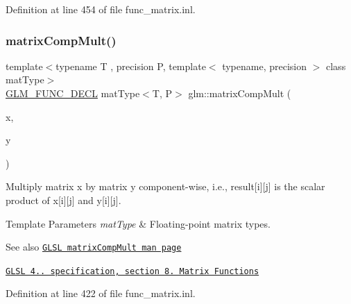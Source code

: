 Definition at line 454 of file func\+\_\+matrix.\+inl.

\mbox{\label{group__core__func__matrix_ga4a54992e4741188ee624b21e3ba91814}} 
\subsubsection{\texorpdfstring{matrix\+Comp\+Mult()}{matrixCompMult()}}
{\footnotesize\ttfamily template$<$typename T , precision P, template$<$ typename, precision $>$ class mat\+Type$>$ \\
\hyperlink{setup_8hpp_ab2d052de21a70539923e9bcbf6e83a51}{G\+L\+M\+\_\+\+F\+U\+N\+C\+\_\+\+D\+E\+CL} mat\+Type$<$T, P$>$ glm\+::matrix\+Comp\+Mult (\begin{DoxyParamCaption}\item[{mat\+Type$<$ T, P $>$ const \&}]{x,  }\item[{mat\+Type$<$ T, P $>$ const \&}]{y }\end{DoxyParamCaption})}

Multiply matrix x by matrix y component-\/wise, i.\+e., result\mbox{[}i\mbox{]}\mbox{[}j\mbox{]} is the scalar product of x\mbox{[}i\mbox{]}\mbox{[}j\mbox{]} and y\mbox{[}i\mbox{]}\mbox{[}j\mbox{]}.


\begin{DoxyTemplParams}{Template Parameters}
{\em mat\+Type} & Floating-\/point matrix types.\\
\hline
\end{DoxyTemplParams}
\begin{DoxySeeAlso}{See also}
\href{http://www.opengl.org/sdk/docs/manglsl/xhtml/matrixCompMult.xml}{\tt G\+L\+SL matrix\+Comp\+Mult man page} 

\href{http://www.opengl.org/registry/doc/GLSLangSpec.4.20.8.pdf}{\tt G\+L\+SL 4.. specification, section 8. Matrix Functions} 
\end{DoxySeeAlso}


Definition at line 422 of file func\+\_\+matrix.\+inl.

\mbox{\label{group__core__func__matrix_gae9f513dc8e4f3ceb993669321b6d0f09}} 
